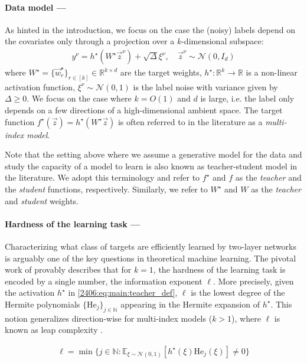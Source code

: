 \paragraph{Data model ---} As hinted in the introduction, we focus on the case the (noisy) labels depend on the covariates only through a projection over a $k$-dimensional subspace:
\begin{align}
\label{2406:eq:main:teacher_def}
     y^\nu = h^\star(W^\star \vec z^\nu)  + \sqrt{\Delta} \xi^\nu, \quad\vec z^\nu \sim \mathcal{N}(0,I_d) 
\end{align}
where $W^\star = \{\vec w^\star_r\}_{r \in [k]}\in \mathbb{R}^{k \times d}$ are the target weights, $h^\star: \mathbb{R}^k \to \mathbb{R}$ is a non-linear activation function, $\xi^\nu \sim \mathcal{N}(0,1)$ is the label noise with variance given by $\Delta\ge0$. We focus on the case where $k = O(1)$ and $d$ is large, i.e. the label only depends on a few directions of a high-dimensional ambient space. The target function $f^{\star}(\vec{z}) = h^{\star}(W^{\star}\vec{z})$ is often referred to in the literature as a \emph{multi-index model}.

Note that the setting above where we assume a generative model for the data and study the capacity of a model to learn is also known as teacher-student model in the literature. We adopt this terminology and refer to $f^\star$ and $f$ as the \textit{teacher} and the \textit{student} functions, respectively. Similarly, we refer to $W^\star$ and $W$ as the \textit{teacher} and \textit{student} weights.

\paragraph{Hardness of the learning task ---} Characterizing what class of targets are efficiently learned by two-layer networks is arguably one of the key questions in theoretical machine learning. The pivotal work of \cite{arous2021online} provably describes that for $k=1$, the hardness of the learning task is encoded by a single number, the information exponent $\ell$. More precisely, given the activation $h^\star$ in \eqref{2406:eq:main:teacher_def}, $\ell$ is the lowest degree of the Hermite polynomials $\{\mathrm{He}_j\}_{j \in \mathbb N}$ appearing in the Hermite expansion of $h^\star$. This notion generalizes direction-wise for multi-index models ($k>1$), where $\ell$ is known as leap complexity \citep{abbe2023sgd}.

\begin{definition}
\label{2406:def:main:information_exponent}
    \begin{align}
        \ell = \min\{j \in \mathbb{N} : \mathbb{E}_{\xi \sim \mathcal{N}(0,1)}\left[ h^\star(\xi) \mathrm{He}_j(\xi)\right] \neq 0\}
    \end{align}
\end{definition}

